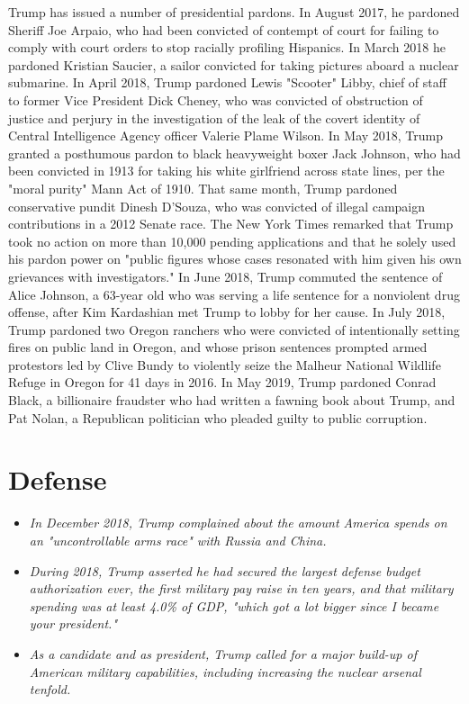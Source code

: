 Trump has issued a number of presidential pardons. In August 2017, he
pardoned Sheriff Joe Arpaio, who had been convicted of contempt of court
for failing to comply with court orders to stop racially profiling
Hispanics. In March 2018 he pardoned Kristian Saucier, a sailor
convicted for taking pictures aboard a nuclear submarine. In April 2018,
Trump pardoned Lewis "Scooter" Libby, chief of staff to former Vice
President Dick Cheney, who was convicted of obstruction of justice and
perjury in the investigation of the leak of the covert identity of
Central Intelligence Agency officer Valerie Plame Wilson. In May 2018,
Trump granted a posthumous pardon to black heavyweight boxer Jack
Johnson, who had been convicted in 1913 for taking his white girlfriend
across state lines, per the "moral purity" Mann Act of 1910. That same
month, Trump pardoned conservative pundit Dinesh D'Souza, who was
convicted of illegal campaign contributions in a 2012 Senate race. The
New York Times remarked that Trump took no action on more than 10,000
pending applications and that he solely used his pardon power on "public
figures whose cases resonated with him given his own grievances with
investigators." In June 2018, Trump commuted the sentence of Alice
Johnson, a 63-year old who was serving a life sentence for a nonviolent
drug offense, after Kim Kardashian met Trump to lobby for her cause. In
July 2018, Trump pardoned two Oregon ranchers who were convicted of
intentionally setting fires on public land in Oregon, and whose prison
sentences prompted armed protestors led by Clive Bundy to violently
seize the Malheur National Wildlife Refuge in Oregon for 41 days in
2016. In May 2019, Trump pardoned Conrad Black, a billionaire fraudster
who had written a fawning book about Trump, and Pat Nolan, a Republican
politician who pleaded guilty to public corruption.

\section{Defense}\label{defense}

\begin{itemize}
\item
  \emph{In December 2018, Trump complained about the amount America
  spends on an "uncontrollable arms race" with Russia and China.}
\item
  \emph{During 2018, Trump asserted he had secured the largest defense
  budget authorization ever, the first military pay raise in ten years,
  and that military spending was at least 4.0\% of GDP, "which got a lot
  bigger since I became your president."}
\item
  \emph{As a candidate and as president, Trump called for a major
  build-up of American military capabilities, including increasing the
  nuclear arsenal tenfold.}
\end{itemize}

